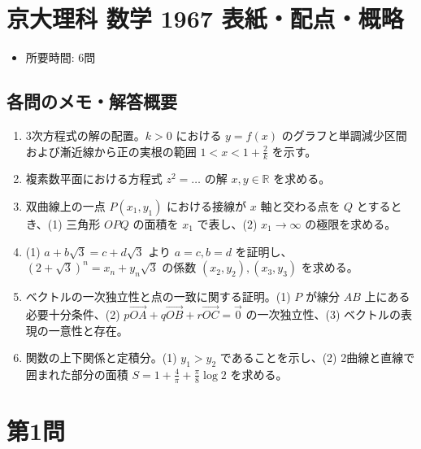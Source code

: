 \documentclass[../main.tex]{subfiles}
\begin{document}
\section*{京大理科 数学 1967 表紙・配点・概略}

\begin{itemize}
  \item 所要時間: 6問
\end{itemize}

\subsection*{各問のメモ・解答概要}
\begin{enumerate}
  \item 3次方程式の解の配置。$k > 0$ における $y = f(x)$ のグラフと単調減少区間および漸近線から正の実根の範囲 $1 < x < 1 + \frac{2}{k}$ を示す。
  \item 複素数平面における方程式 $z^2 = \dots$ の解 $x, y \in \mathbb{R}$ を求める。
  \item 双曲線上の一点 $P(x_1, y_1)$ における接線が $x$ 軸と交わる点を $Q$ とするとき、(1) 三角形 $OPQ$ の面積を $x_1$ で表し、(2) $x_1 \to \infty$ の極限を求める。
  \item (1) $a+b\sqrt{3}=c+d\sqrt{3}$ より $a=c, b=d$ を証明し、$(2+\sqrt{3})^n = x_n + y_n \sqrt{3}$ の係数 $(x_2,y_2), (x_3,y_3)$ を求める。
  \item ベクトルの一次独立性と点の一致に関する証明。(1) $P$ が線分 $AB$ 上にある必要十分条件、(2) $p\vec{OA}+q\vec{OB}+r\vec{OC}=\vec{0}$ の一次独立性、(3) ベクトルの表現の一意性と存在。
  \item 関数の上下関係と定積分。(1) $y_1 > y_2$ であることを示し、(2) 2曲線と直線で囲まれた部分の面積 $S = 1 + \frac{4}{\pi} + \frac{\pi}{8} \log 2$ を求める。
\end{enumerate}

\newpage

\section*{第1問}
\end{document}
